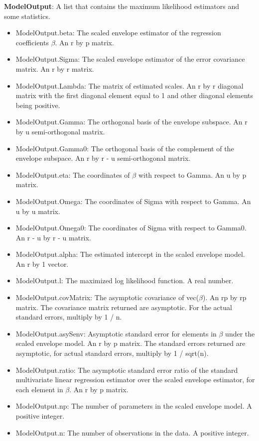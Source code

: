 \documentclass[a4paper,11pt,openany]{memoir}
\begin{document}
\begin{par}
\textbf{ModelOutput}: A list that contains the maximum likelihood estimators and some statistics.
\end{par} \vspace{1em}
\begin{itemize}
\setlength{\itemsep}{-1ex}
   \item ModelOutput.beta: The scaled envelope estimator of the regression coefficients $\beta$. An r by p matrix.
   \item ModelOutput.Sigma: The scaled envelope estimator of the error covariance matrix.  An r by r matrix.
   \item ModelOutput.Lambda: The matrix of estimated scales. An r by r diagonal matrix with the first diagonal element equal to 1 and other diagonal elements being positive.
   \item ModelOutput.Gamma: The orthogonal basis of the envelope subspace. An r by u semi-orthogonal matrix.
   \item ModelOutput.Gamma0: The orthogonal basis of the complement of the envelope subspace.  An r by r - u semi-orthogonal matrix.
   \item ModelOutput.eta: The coordinates of $\beta$ with respect to Gamma. An u by p matrix.
   \item ModelOutput.Omega: The coordinates of Sigma with respect to Gamma. An u by u matrix.
   \item ModelOutput.Omega0: The coordinates of Sigma with respect to Gamma0. An r - u by r - u matrix.
   \item ModelOutput.alpha: The estimated intercept in the scaled envelope model.  An r by 1 vector.
   \item ModelOutput.l: The maximized log likelihood function.  A real number.
   \item ModelOutput.covMatrix: The asymptotic covariance of vec($\beta$).  An rp by rp matrix.  The covariance matrix returned are asymptotic.  For the actual standard errors, multiply by 1 / n.
   \item ModelOutput.asySenv: Asymptotic standard error for elements in $\beta$ under the scaled envelope model.  An r by p matrix.  The standard errors returned are asymptotic, for actual standard errors, multiply by 1 / sqrt(n).
   \item ModelOutput.ratio: The asymptotic standard error ratio of the standard multivariate linear regression estimator over the scaled envelope estimator, for each element in $\beta$.  An r by p matrix.
   \item ModelOutput.np: The number of parameters in the scaled envelope model.  A positive integer.
   \item ModelOutput.n: The number of observations in the data.  A positive integer.
\end{itemize}
\end{document}
